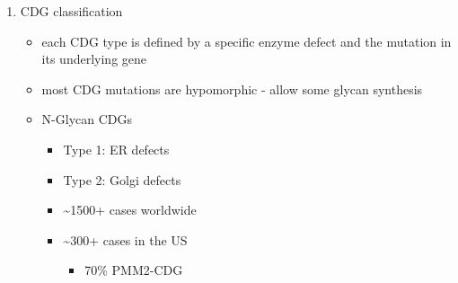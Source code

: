 \documentclass{scrartcl}
\begin{document}
\begin{enumerate}
\item CDG classification
\label{sec:orgf38cfc9}
\begin{itemize}
\item each CDG type is defined by a specific enzyme defect and the mutation in its underlying gene
\item most CDG mutations are hypomorphic - allow some glycan synthesis
\item N-Glycan CDGs
\begin{itemize}
\item Type 1: ER defects
\item Type 2: Golgi defects
\item \textasciitilde{}1500+ cases worldwide
\item \textasciitilde{}300+ cases in the US
\begin{itemize}
\item 70\% PMM2-CDG
\end{itemize}
\end{itemize}
\end{itemize}
\end{enumerate}
\end{document}
